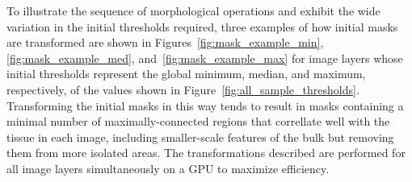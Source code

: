 \documentclass[letterpaper,11pt]{article}
\newcommand{\reffig}[1]{Figure~\ref{#1}}
\begin{document}
To illustrate the sequence of morphological operations and exhibit the wide variation in the initial thresholds required, three examples of how initial masks are transformed are shown in Figures~\ref{fig:mask_example_min}, \ref{fig:mask_example_med}, and~\ref{fig:mask_example_max} for image layers whose initial thresholds represent the global minimum, median, and maximum, respectively, of the values shown in \reffig{fig:all_sample_thresholds}. Transforming the initial masks in this way tends to result in masks containing a minimal number of maximally-connected regions that correllate well with the tissue in each image, including smaller-scale features of the bulk but removing them from more isolated areas. The transformations described are performed for all image layers simultaneously on a GPU to maximize efficiency. 
\end{document}
